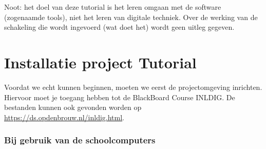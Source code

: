 \documentclass[a4paper,12pt,fleqn,twoside]{book}
\begin{document}
Noot: het doel van deze tutorial is het leren omgaan met de software
(zogenaamde tools), niet het leren van digitale techniek. Over de werking van
de schakeling die wordt ingevoerd (wat doet het) wordt geen uitleg gegeven.


\section{Installatie project Tutorial}
\label{sec:installatie}
\label{sec:installatieprojecttutorial}
Voordat we echt kunnen beginnen, moeten we eerst de projectomgeving inrichten.
Hiervoor moet je toegang hebben tot de BlackBoard Course INLDIG. De bestanden
kunnen ook gevonden worden op \url{https://ds.opdenbrouw.nl/inldig.html}.

\subsubsection*{Bij gebruik van de schoolcomputers}
\end{document}
